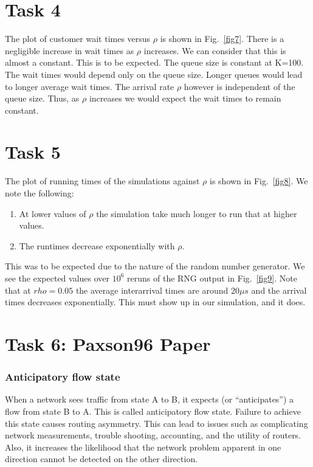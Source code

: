 \documentclass[10pt]{article}
\begin{document}


\section{Task 4}
\label{task4}

The plot of customer wait times versus $\rho$ is shown in Fig.~\ref{fig7}. There is a negligible increase in wait times as $\rho$ increases. We can consider that this is almost a constant. This is to be expected. The queue size is constant at K=100. The wait times would depend only on the queue size. Longer queues would lead to longer average wait times. The arrival rate $\rho$ however is independent of the queue size. Thus, as $\rho$ increases we would expect the wait times to remain constant.
\section{Task 5}
\label{task5}

The plot of running times of the simulations against $\rho$ is shown in Fig.~\ref{fig8}. We note the following:

\begin{enumerate}
\item At lower values of $\rho$ the simulation take much longer to run that at higher values. 
\item The runtimes decrease exponentially with $\rho$.
\end{enumerate}



This was to be expected due to the nature of the random number generator. We see the expected values over $10^6$ reruns of the RNG output in Fig.~\ref{fig9}. Note that at $rho=0.05$ the average interarrival times are around 20$\mu s$ and the arrival times decreases exponentially. This must show up in our simulation, and it does.
\newpage
\section*{Task 6: Paxson96 Paper}
\subsubsection*{Anticipatory flow state}

When a network sees traffic from state A to B, it expects (or ``anticipates'') a flow from state B to A. This is called anticipatory flow state. Failure to achieve this state causes routing asymmetry. This can lead to issues such as complicating network measurements, trouble shooting, accounting, and the utility of routers. Also, it increases the likelihood that the network problem apparent in one direction cannot be detected on the other direction.
\end{document}
